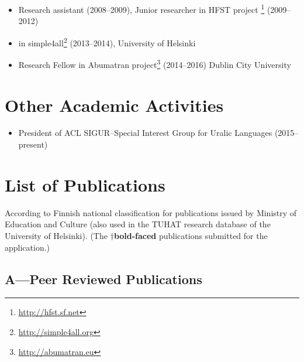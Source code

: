 \documentclass[a4paper]{article}
\begin{document}
\begin{itemize}
\item Research assistant (2008–2009), Junior researcher in HFST project \footnote{\url{http://hfst.sf.net}} (2009–2012)
\item in simple4all\footnote{\url{http://simple4all.org}} (2013–2014), University of Helsinki
\item Research Fellow in Abumatran project\footnote{\url{http://abumatran.eu}} (2014–2016) Dublin City University
\end{itemize}

\section*{Other Academic Activities}

\begin{itemize}
\item President of ACL SIGUR–Special Interest Group for Uralic Languages (2015–present)
\end{itemize}

\section*{List of Publications}

According to Finnish national classification for publications issued by Ministry of Education and Culture (also used in the TUHAT research database of the University of Helsinki).  
(The \textbf{$\dagger$bold-faced} publications submitted for the application.)


\subsection*{A---Peer Reviewed Publications}
\end{document}
